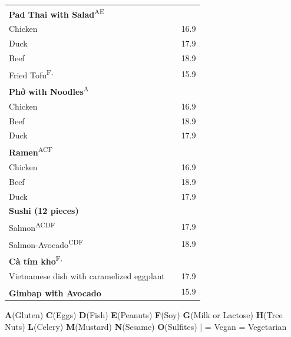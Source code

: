 \documentclass[a4paper,12pt]{article}
\newcommand{\vegan}{\textbf{\scriptsize \color{vegan}{Vegan}}}
\begin{document}
\begin{multicols}{2}
\begin{tabular}{Lrr}
\textbf{Pad Thai with Salad}\textsuperscript{{\scriptsize AE}}\\
\hspace{0.4cm}Chicken & & 16.9\\
\hspace{0.4cm}Duck & & 17.9\\
\hspace{0.4cm}Beef & & 18.9\\
\hspace{0.4cm}Fried Tofu\textsuperscript{{\scriptsize F, \vegan}} & & 15.9\\
\textbf{Phở with Noodles}\textsuperscript{{\scriptsize A}}\\
\hspace{0.4cm}Chicken & & 16.9\\
\hspace{0.4cm}Beef & & 18.9\\
\hspace{0.4cm}Duck & & 17.9\\
\textbf{Ramen}\textsuperscript{{\scriptsize ACF}}\\
\hspace{0.4cm}Chicken & & 16.9\\
\hspace{0.4cm}Beef & & 18.9\\
\hspace{0.4cm}Duck & & 17.9\\
\textbf{Sushi (12 pieces)}\\
\hspace{0.4cm}Salmon\textsuperscript{{\scriptsize ACDF}} & & 17.9\\
\hspace{0.4cm}Salmon-Avocado\textsuperscript{{\scriptsize CDF}} & & 18.9\\
\textbf{Cà tím kho}\textsuperscript{{\scriptsize F, \vegan}}\\
\hspace{0.4cm}\scriptsize Vietnamese dish with caramelized eggplant & & 17.9\\
\textbf{Gimbap with Avocado}\textsuperscript{{\scriptsize \vegan}} & & 15.9
\end{tabular}

\end{multicols}

\vfill

\begin{tcolorbox}[
  width=\textwidth,
  colback=white,
  colframe=white,
  enhanced,
]
\centering
{\scriptsize\color{gray}
\textbf{A}(Gluten) 
\textbf{C}(Eggs)
\textbf{D}(Fish) 
\textbf{E}(Peanuts) 
\textbf{F}(Soy) 
\textbf{G}(Milk or Lactose)
\textbf{H}(Tree Nuts)
\textbf{L}(Celery) 
\textbf{M}(Mustard)
\textbf{N}(Sesame) 
\textbf{O}(Sulfites) \quad |  = Vegan  = Vegetarian}
\end{tcolorbox}
\end{document}
